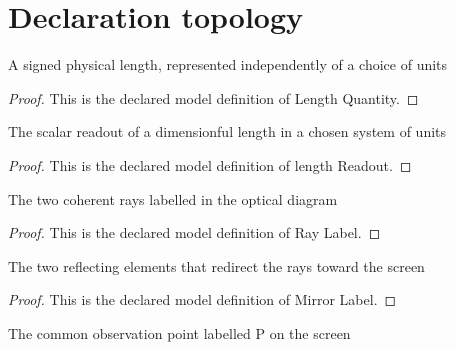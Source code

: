 \section{Declaration topology}
\begin{definition}
  \label{def:physics:phyx-mini-0089:phyxminiproblems-problemphyxmini0089-lengthquantity}
  A signed physical length, represented independently of a choice of units
\end{definition}
\begin{proof}
  This is the declared model definition of Length Quantity.
\end{proof}
\begin{definition}
  \label{def:physics:phyx-mini-0089:phyxminiproblems-problemphyxmini0089-lengthreadout}
  The scalar readout of a dimensionful length in a chosen system of units
\end{definition}
\begin{proof}
  This is the declared model definition of length Readout.
\end{proof}
\begin{definition}
  \label{def:physics:phyx-mini-0089:phyxminiproblems-problemphyxmini0089-raylabel}
  The two coherent rays labelled in the optical diagram
\end{definition}
\begin{proof}
  This is the declared model definition of Ray Label.
\end{proof}
\begin{definition}
  \label{def:physics:phyx-mini-0089:phyxminiproblems-problemphyxmini0089-mirrorlabel}
  The two reflecting elements that redirect the rays toward the screen
\end{definition}
\begin{proof}
  This is the declared model definition of Mirror Label.
\end{proof}
\begin{definition}
  \label{def:physics:phyx-mini-0089:phyxminiproblems-problemphyxmini0089-screenpoint}
  The common observation point labelled P on the screen
\end{definition}
